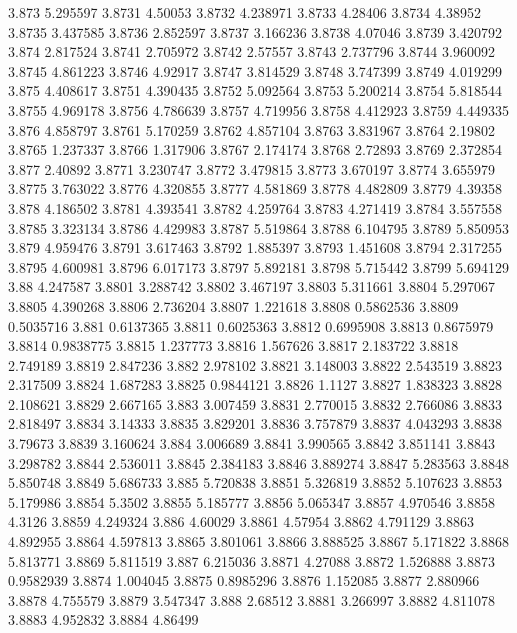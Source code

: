 3.873  5.295597
3.8731  4.50053
3.8732  4.238971
3.8733  4.28406
3.8734  4.38952
3.8735  3.437585
3.8736  2.852597
3.8737  3.166236
3.8738  4.07046
3.8739  3.420792
3.874  2.817524
3.8741  2.705972
3.8742  2.57557
3.8743  2.737796
3.8744  3.960092
3.8745  4.861223
3.8746  4.92917
3.8747  3.814529
3.8748  3.747399
3.8749  4.019299
3.875  4.408617
3.8751  4.390435
3.8752  5.092564
3.8753  5.200214
3.8754  5.818544
3.8755  4.969178
3.8756  4.786639
3.8757  4.719956
3.8758  4.412923
3.8759  4.449335
3.876  4.858797
3.8761  5.170259
3.8762  4.857104
3.8763  3.831967
3.8764  2.19802
3.8765  1.237337
3.8766  1.317906
3.8767  2.174174
3.8768  2.72893
3.8769  2.372854
3.877  2.40892
3.8771  3.230747
3.8772  3.479815
3.8773  3.670197
3.8774  3.655979
3.8775  3.763022
3.8776  4.320855
3.8777  4.581869
3.8778  4.482809
3.8779  4.39358
3.878  4.186502
3.8781  4.393541
3.8782  4.259764
3.8783  4.271419
3.8784  3.557558
3.8785  3.323134
3.8786  4.429983
3.8787  5.519864
3.8788  6.104795
3.8789  5.850953
3.879  4.959476
3.8791  3.617463
3.8792  1.885397
3.8793  1.451608
3.8794  2.317255
3.8795  4.600981
3.8796  6.017173
3.8797  5.892181
3.8798  5.715442
3.8799  5.694129
3.88  4.247587
3.8801  3.288742
3.8802  3.467197
3.8803  5.311661
3.8804  5.297067
3.8805  4.390268
3.8806  2.736204
3.8807  1.221618
3.8808  0.5862536
3.8809  0.5035716
3.881  0.6137365
3.8811  0.6025363
3.8812  0.6995908
3.8813  0.8675979
3.8814  0.9838775
3.8815  1.237773
3.8816  1.567626
3.8817  2.183722
3.8818  2.749189
3.8819  2.847236
3.882  2.978102
3.8821  3.148003
3.8822  2.543519
3.8823  2.317509
3.8824  1.687283
3.8825  0.9844121
3.8826  1.1127
3.8827  1.838323
3.8828  2.108621
3.8829  2.667165
3.883  3.007459
3.8831  2.770015
3.8832  2.766086
3.8833  2.818497
3.8834  3.14333
3.8835  3.829201
3.8836  3.757879
3.8837  4.043293
3.8838  3.79673
3.8839  3.160624
3.884  3.006689
3.8841  3.990565
3.8842  3.851141
3.8843  3.298782
3.8844  2.536011
3.8845  2.384183
3.8846  3.889274
3.8847  5.283563
3.8848  5.850748
3.8849  5.686733
3.885  5.720838
3.8851  5.326819
3.8852  5.107623
3.8853  5.179986
3.8854  5.3502
3.8855  5.185777
3.8856  5.065347
3.8857  4.970546
3.8858  4.3126
3.8859  4.249324
3.886  4.60029
3.8861  4.57954
3.8862  4.791129
3.8863  4.892955
3.8864  4.597813
3.8865  3.801061
3.8866  3.888525
3.8867  5.171822
3.8868  5.813771
3.8869  5.811519
3.887  6.215036
3.8871  4.27088
3.8872  1.526888
3.8873  0.9582939
3.8874  1.004045
3.8875  0.8985296
3.8876  1.152085
3.8877  2.880966
3.8878  4.755579
3.8879  3.547347
3.888  2.68512
3.8881  3.266997
3.8882  4.811078
3.8883  4.952832
3.8884  4.86499
